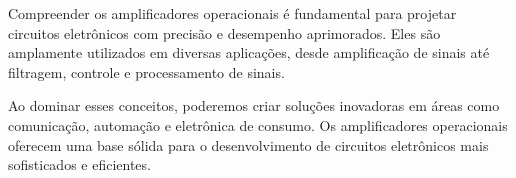 \documentclass[12pt,twoside, a4paper, twocolumn]{article}
\begin{document}
Compreender os amplificadores operacionais é fundamental para projetar circuitos eletrônicos com precisão e desempenho aprimorados. Eles são amplamente utilizados em diversas aplicações, desde amplificação de sinais até filtragem, controle e processamento de sinais.


Ao dominar esses conceitos, poderemos criar soluções inovadoras em áreas como comunicação, automação e eletrônica de consumo. Os amplificadores operacionais oferecem uma base sólida para o desenvolvimento de circuitos eletrônicos mais sofisticados e eficientes.




\end{document}
